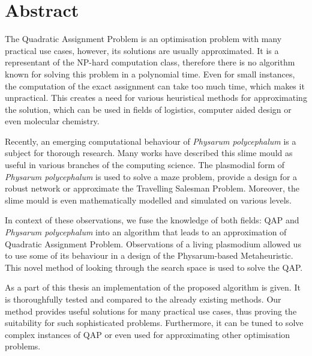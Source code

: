 \chapter*{Abstract}

The Quadratic Assignment Problem is an optimisation problem with many practical use cases, however, its solutions are usually approximated. It is a representant of the NP-hard computation class, therefore there is no algorithm known for solving this problem in a polynomial time. Even for small instances, the computation of the exact assignment can take too much time, which makes it unpractical. This creates a need for various heuristical methods for approximating the solution, which can be used in fields of logistics, computer aided design or even molecular chemistry.

Recently, an emerging computational behaviour of \textit{Physarum polycephalum} is a subject for thorough research. Many works have described this slime mould as useful in various branches of the computing science. The plasmodial form of \textit{Physarum polycephalum} is used to solve a maze problem, provide a design for a robust network or approximate the Travelling Salesman Problem. Moreover, the slime mould is even mathematically modelled and simulated on various levels.

In context of these observations, we fuse the knowledge of both fields: QAP and \textit{Physarum polycephalum} into an algorithm that leads to an approximation of Quadratic Assignment Problem. Observations of a living plasmodium allowed us to use some of its behaviour in a design of the Physarum-based Metaheuristic. This novel method of looking through the search space is used to solve the QAP.

As a part of this thesis an implementation of the proposed algorithm is given. It is thoroughfully tested and compared to the already existing methods. Our method provides useful solutions for many practical use cases, thus proving the suitability for such sophisticated problems. Furthermore, it can be tuned to solve complex instances of QAP or even used for approximating other optimisation problems.
